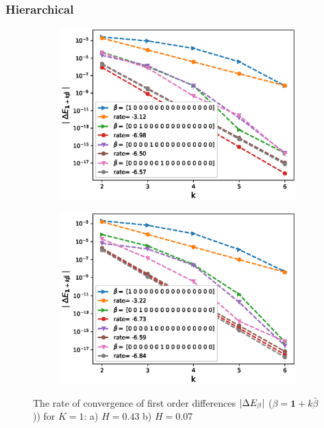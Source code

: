\documentclass[11pt]{article}
\begin{document}
\subsubsection{Hierarchical}
\begin{figure}[h!]
	\centering
	\begin{subfigure}{.5\textwidth}
		\centering
		\includegraphics[width=1\linewidth]{./figures/effect_H_differences/hierarchical/H_043/N_8/first_difference_rbergomi_8steps_H_043_K_1_hierarch_with_rate_W1.eps}
		\caption{}
		\label{fig:sub3}
	\end{subfigure}%
	\begin{subfigure}{.5\textwidth}
		\centering
		\includegraphics[width=1\linewidth]{./figures/effect_H_differences/hierarchical/H_007/N_8/first_difference_rbergomi_8steps_H_007_K_1_hierarch_with_rate_W1.eps}
		\caption{}
		\label{fig:sub4}
	\end{subfigure}
	
	\caption{The rate of convergence of  first order differences $\left\lvert\Delta E_{\beta}\right\rvert$ ($\beta=\mathbf{1}+k \bar{\beta}$)) for $K=1$: a) $H=0.43$ b)  $H=0.07$}
	\label{fig:test2}
\end{figure}
\end{document}
